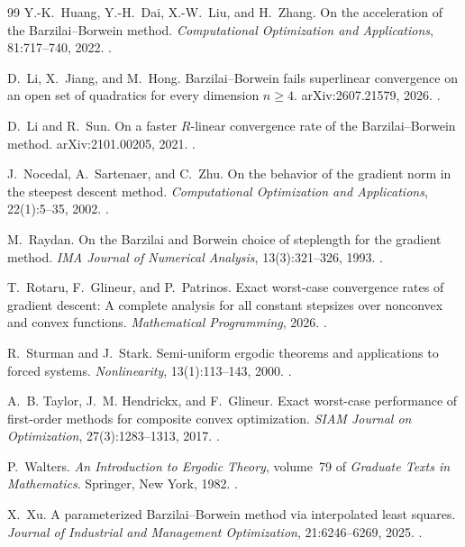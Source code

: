 \begin{thebibliography}{99}
Y.-K.~Huang, Y.-H.~Dai, X.-W.~Liu, and H.~Zhang.
On the acceleration of the Barzilai--Borwein method.
\emph{Computational Optimization and Applications}, 81:717--740, 2022.
.

D.~Li, X.~Jiang, and M.~Hong.
Barzilai--Borwein fails superlinear convergence on an open set of quadratics
for every dimension $n\ge4$.
arXiv:2607.21579, 2026.
.

D.~Li and R.~Sun.
On a faster $R$-linear convergence rate of the Barzilai--Borwein method.
arXiv:2101.00205, 2021.
.

J.~Nocedal, A.~Sartenaer, and C.~Zhu.
On the behavior of the gradient norm in the steepest descent method.
\emph{Computational Optimization and Applications}, 22(1):5--35, 2002.
.

M.~Raydan.
On the Barzilai and Borwein choice of steplength for the gradient method.
\emph{IMA Journal of Numerical Analysis}, 13(3):321--326, 1993.
.

T.~Rotaru, F.~Glineur, and P.~Patrinos.
Exact worst-case convergence rates of gradient descent: A complete analysis
for all constant stepsizes over nonconvex and convex functions.
\emph{Mathematical Programming}, 2026.
.

R.~Sturman and J.~Stark.
Semi-uniform ergodic theorems and applications to forced systems.
\emph{Nonlinearity}, 13(1):113--143, 2000.
.

A.~B. Taylor, J.~M. Hendrickx, and F.~Glineur.
Exact worst-case performance of first-order methods for composite convex
optimization.
\emph{SIAM Journal on Optimization}, 27(3):1283--1313, 2017.
.

P.~Walters.
\emph{An Introduction to Ergodic Theory}, volume~79 of \emph{Graduate Texts
in Mathematics}. Springer, New York, 1982.
.

X.~Xu.
A parameterized Barzilai--Borwein method via interpolated least squares.
\emph{Journal of Industrial and Management Optimization}, 21:6246--6269, 2025.
.


\end{thebibliography}
